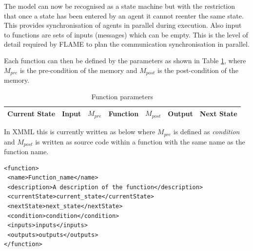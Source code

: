 The model can now be recognised as a state machine but with the restriction
that once a state has been entered by an agent it cannot reenter the same
state. This provides synchronisation of agents in parallel during execution. Also
input to functions are sets of inputs (messages) which can be empty. This is
the level of detail required by FLAME to plan the communication synchronisation
in parallel.

Each function can then be defined by the parameters as shown in Table
\ref{tab:funcparameters}, where $M_{pre}$ is the pre-condition of the memory
and $M_{post}$ is the post-condition of the memory.

\begin{table}[hbp]
\centering
\begin{tabular}{|l|l|l||l||l|l|l|}
\hline
Current State&Input&$M_{pre}$&Function&$M_{post}$&Output&Next State\\
\hline
\end{tabular}
\caption{Function parameters} \label{tab:funcparameters}
\end{table}

In XMML this is currently written as below where $M_{pre}$ is defined as
\textit{condition} and $M_{post}$ is written as source code within a function
with the same name as the function name.

\begin{mylisting}
\begin{verbatim}
<function>
 <name>Function_name</name>
 <description>A description of the function</description>
 <currentState>current_state</currentState>
 <nextState>next_state</nextState>
 <condition>condition</condition>
 <inputs>inputs</inputs>
 <outputs>outputs</outputs>
</function>
\end{verbatim}
\end{mylisting}

